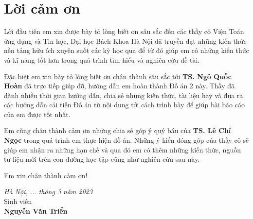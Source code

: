 \newpage
{}
\chapter*{Lời cảm ơn}
    Lời đầu tiên em xin được bày tỏ lòng biết ơn sâu sắc đến các thầy cô Viện Toán ứng dụng và Tin học, Đại học Bách Khoa Hà Nội đã truyền đạt những kiến thức nền tảng hữu ích xuyên suốt các kỳ học qua để từ đó giúp em có những kiến thức và kĩ năng tốt hơn trong quá trình tìm hiểu và nghiên cứu đề tài.
    
    Đặc biệt em xin bày tỏ lòng biết ơn chân thành sâu sắc tới \textbf{TS. Ngô Quốc Hoàn} đã trực tiếp giúp đỡ, hướng dẫn em hoàn thành Đồ án 2 này. Thầy đã dành nhiều thời gian hướng dẫn, chia sẻ những kiến thức, tài liệu hay và đưa ra các hướng dẫn cải tiến Đồ án từ nội dung tới cách trình bày để giúp bài báo cáo của em được tốt nhất.
    
    Em cũng chân thành cảm ơn những chia sẻ góp ý quý báu của \textbf{TS. Lê Chí Ngọc} trong quá trình em thực hiện đồ án. 
		Những ý kiến đóng góp của thầy cô sẽ giúp em nhận ra những hạn chế và qua đó em có thêm những kiến thức, nguồn tư liệu mới trên con đường học tập cũng như nghiên cứu sau này.
    
    Em xin chân thành cảm ơn!
    
\vspace{1.5cm}
\hspace{0.5\textwidth}
\begin{minipage}{0.5\textwidth}
	\noindent\begin{center}
		\textit{Hà Nội, ... tháng 3 năm 2023} \\
		Sinh viên\\ \vspace{2cm}
		\textbf{Nguyễn Văn Triển} \\
	\end{center}	
\end{minipage}
\newpage